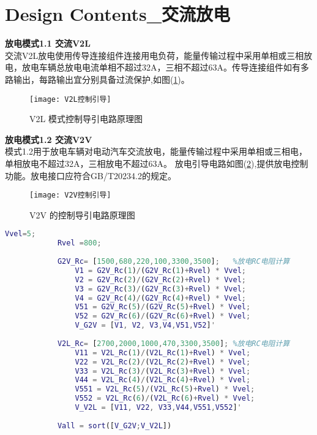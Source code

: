 

\clearpage
    \section{Design Contents\_交流放电}
    \textcolor{myred}{\textbf{放电模式1.1 交流V2L}}\cite{GB18487_4}\\
     交流V2L放电使用传导连接组件连接用电负荷，能量传输过程中采用单相或三相放电，放电车辆总放电电流单相不超过32A，三相不超过63A。传导连接组件如有多路输出，每路输出宜分别具备过流保护,如图(\ref{fig:V2L})。
        \begin{figure}[H]
            \centering
            \texttt{[image: V2L控制引导]}
            \caption{V2L 模式控制导引电路原理图}
            \label{fig:V2L}
        \end{figure}
    \textcolor{myred}{\textbf{放电模式1.2 交流V2V}}\cite{GB18487_4}\\
    模式1.2用于放电车辆对电动汽车交流放电，能量传输过程中采用单相或三相电，单相放电不超过32A，三相放电不超过63A。
    放电引导电路如图(\ref{fig:V2V}),提供放电控制功能。放电接口应符合GB/T20234.2的规定\cite{GB18487_2}。%
        \begin{figure}[H]
            \centering
            \texttt{[image: V2V控制引导]}
            \caption{V2V 的控制导引电路原理图}
            \label{fig:V2V}
        \end{figure}

        \begin{lstlisting}[language = matlab]
            Vvel=5;
            Rvel =800;
            
            G2V_Rc= [1500,680,220,100,3300,3500];   %放电RC电阻计算
                V1 = G2V_Rc(1)/(G2V_Rc(1)+Rvel) * Vvel;
                V2 = G2V_Rc(2)/(G2V_Rc(2)+Rvel) * Vvel;
                V3 = G2V_Rc(3)/(G2V_Rc(3)+Rvel) * Vvel;
                V4 = G2V_Rc(4)/(G2V_Rc(4)+Rvel) * Vvel;
                V51 = G2V_Rc(5)/(G2V_Rc(5)+Rvel) * Vvel;
                V52 = G2V_Rc(6)/(G2V_Rc(6)+Rvel) * Vvel;
                V_G2V = [V1, V2, V3,V4,V51,V52]'
                      
            V2L_Rc= [2700,2000,1000,470,3300,3500]; %放电RC电阻计算
                V11 = V2L_Rc(1)/(V2L_Rc(1)+Rvel) * Vvel;
                V22 = V2L_Rc(2)/(V2L_Rc(2)+Rvel) * Vvel;
                V33 = V2L_Rc(3)/(V2L_Rc(3)+Rvel) * Vvel;
                V44 = V2L_Rc(4)/(V2L_Rc(4)+Rvel) * Vvel;
                V551 = V2L_Rc(5)/(V2L_Rc(5)+Rvel) * Vvel;
                V552 = V2L_Rc(6)/(V2L_Rc(6)+Rvel) * Vvel;
                V_V2L = [V11, V22, V33,V44,V551,V552]'
            
            Vall = sort([V_G2V;V_V2L])
        \end{lstlisting}


